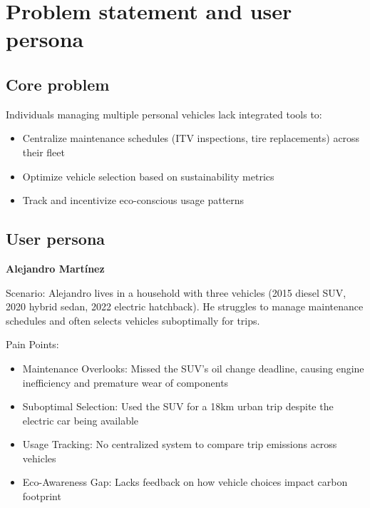 \section{Problem statement and user persona}

\subsection{Core problem}

Individuals managing multiple personal vehicles lack integrated tools to:

\begin{itemize}
    \item Centralize maintenance schedules (ITV inspections, tire replacements) across their fleet

    \item Optimize vehicle selection based on sustainability metrics

    \item Track and incentivize eco-conscious usage patterns
\end{itemize}

\subsection{User persona}
\textbf{Alejandro Martínez}

\vspace{0.7em}

\begin{flushleft}
    Scenario: Alejandro lives in a household with three vehicles (2015 diesel SUV, 2020 hybrid sedan, 2022 electric hatchback). He struggles to manage maintenance schedules and often selects vehicles suboptimally for trips.
\end{flushleft}

Pain Points:

\begin{itemize}
    \item Maintenance Overlooks: Missed the SUV's oil change deadline, causing engine inefficiency and premature wear of components
    
    \item Suboptimal Selection: Used the SUV for a 18km urban trip despite the electric car being available
    
    \item Usage Tracking: No centralized system to compare trip emissions across vehicles
    
    \item Eco-Awareness Gap: Lacks feedback on how vehicle choices impact carbon footprint
\end{itemize}


